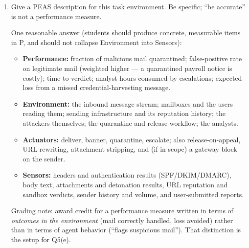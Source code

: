 \begin{enumerate}
\item Give a PEAS description for this task environment. Be specific; ``be accurate'' is not a
performance measure.
\ansspace{6.5cm}
\begin{sol}
One reasonable answer (students should produce concrete, measurable items in P, and should not
collapse Environment into Sensors):

\begin{itemize}[leftmargin=1.5em]
\item \textbf{Performance:} fraction of malicious mail quarantined; false-positive rate on
legitimate mail (weighted higher --- a quarantined payroll notice is costly); time-to-verdict;
analyst hours consumed by escalations; expected loss from a missed credential-harvesting
message.
\item \textbf{Environment:} the inbound message stream; mailboxes and the users reading them;
sending infrastructure and its reputation history; the attackers themselves; the quarantine and
release workflow; the analysts.
\item \textbf{Actuators:} deliver, banner, quarantine, escalate; also release-on-appeal, URL
rewriting, attachment stripping, and (if in scope) a gateway block on the sender.
\item \textbf{Sensors:} headers and authentication results (SPF/DKIM/DMARC), body text,
attachments and detonation results, URL reputation and sandbox verdicts, sender history and
volume, and user-submitted reports.
\end{itemize}
Grading note: award credit for a performance measure written in terms of \emph{outcomes in the
environment} (mail correctly handled, loss avoided) rather than in terms of agent behavior
(``flags suspicious mail''). That distinction is the setup for Q5(e).
\end{sol}


\end{enumerate}
